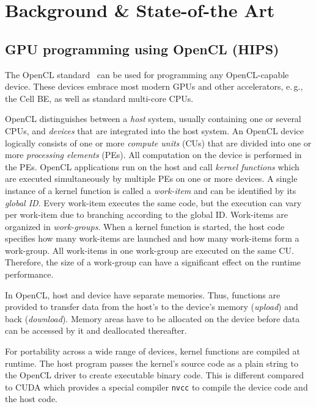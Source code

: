 
\chapter{Background \& State-of-the Art} %

\label{ch:second} %

\section{GPU programming using OpenCL (HIPS)}

The OpenCL standard~\cite{OpenCL-10} can be used for programming any OpenCL-capable device.
These devices embrace most modern GPUs and other accelerators, e.\,g., the Cell BE, as well as standard multi-core CPUs.

OpenCL distinguishes between a \emph{host} system, usually containing one or several CPUs, and \emph{devices} that are integrated into the host system.
An OpenCL device logically consists of one or more \emph{compute units} (CUs) that are divided into one or more \emph{processing elements} (PEs).
All computation on the device is performed in the PEs.
OpenCL applications run on the host and call \emph{kernel functions} which are executed simultaneously by multiple PEs on one or more devices.
A single instance of a kernel function is called a \emph{work-item} and can be identified by its \emph{global ID}.
Every work-item executes the same code, but the execution can vary per work-item due to branching according to the global ID.
Work-items are organized in \emph{work-groups}.
When a kernel function is started, the host code specifies how many work-items are launched and how many work-items form a work-group.
All work-items in one work-group are executed on the same CU.
Therefore, the size of a work-group can have a significant effect on the runtime performance.

In OpenCL, host and device have separate memories.
Thus, functions are provided to transfer data from the host's to the device's memory (\emph{upload}) and back (\emph{download}).
Memory areas have to be allocated on the device before data can be accessed by it and deallocated thereafter.

For portability across a wide range of devices, kernel functions are compiled at runtime.
The host program passes the kernel's source code as a plain string to the OpenCL driver to create executable binary code.
This is different compared to CUDA which provides a special compiler \texttt{nvcc} to compile the device code and the host code.

